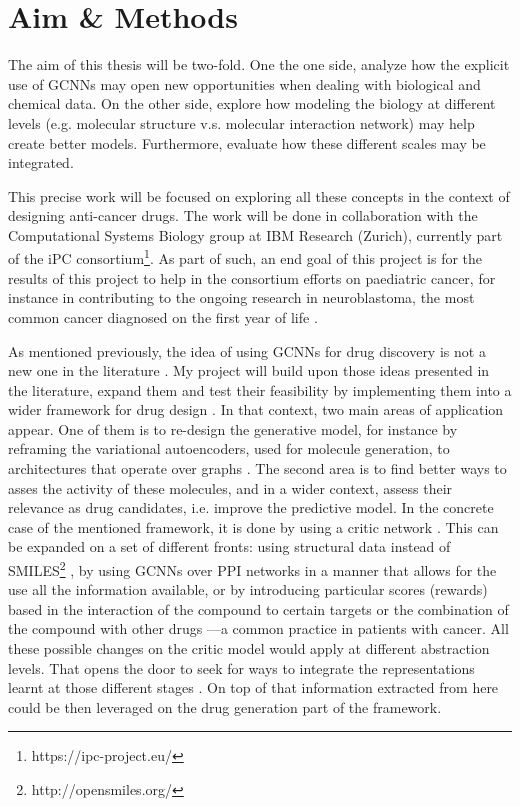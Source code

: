 \documentclass{article}
\begin{document}
    \section*{Aim \& Methods}

The aim of this thesis will be two-fold. One the one side, analyze how the explicit
use of GCNNs may open new opportunities when dealing with biological and chemical
data. On the other side, explore how modeling the biology at different levels (e.g.
molecular structure v.s. molecular interaction network) may help create better
models. Furthermore, evaluate how these different scales may be integrated.

This precise work will be focused on exploring all these concepts in the context of
designing anti-cancer drugs. The work will be done in collaboration with the
Computational Systems Biology group at IBM Research (Zurich), currently part of the iPC
consortium\footnote{https://ipc-project.eu/}. As part of such, an end goal of this
project is for the results of this project to help in the consortium efforts on
paediatric cancer, for instance in contributing to the ongoing research in
neuroblastoma, the most common cancer diagnosed on the first year of life
\cite{Maris2010}.

As mentioned previously, the idea of using GCNNs for drug discovery is not a new one in
the literature \cite{Sun2019}. My project will build upon those ideas presented in the
literature, expand them and test their feasibility by implementing them into a wider
framework for drug design \cite{Born2019}. In that context, two main areas of
application appear. One of them is to re-design the generative model, for instance by
reframing the variational autoencoders, used for molecule generation, to architectures
that operate over graphs \cite{Simonovsky2018,Li2018, Li2018a}. The second area is to
find better ways to asses the activity of these molecules, and in a wider context,
assess their relevance as drug candidates, i.e. improve the predictive model. In the
concrete case of the mentioned framework, it is done by using a critic network
\cite{Manica2019}. This can be expanded on a set of different fronts: using structural
data instead of SMILES\footnote{http://opensmiles.org/} \cite{Li, Do2019}, by using
GCNNs over PPI networks in a manner that allows for the use all the information
available\cite{Oskooei2019, Wang2019}, or by introducing particular scores (rewards)
based in the interaction of the compound to certain targets \cite{YingkaiGao2018,
Zhavoronkov2019} or the combination of the compound with other drugs
\cite{Zitnik2018}---a common practice in patients with cancer. All these possible
changes on the critic model would apply at different abstraction levels. That opens the
door to seek for ways to integrate the representations learnt at those different stages
\cite{Ying2018, Ma2019, Huang2019}. On top of that information extracted from here could
be then leveraged on the drug generation part of the framework.
\end{document}
